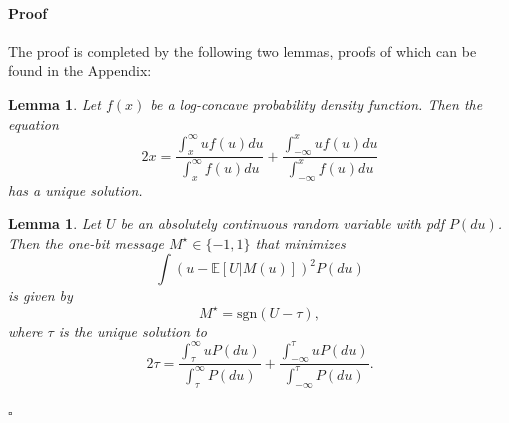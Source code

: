 \documentclass[letterpaper, conference,9pt]{IEEEtran}      %
\newtheorem{lem}[thm]{\bf {Lemma}}
\newenvironment{proof}{\paragraph*{Proof}}{\hfill$\square$ \newline}
\newcommand{\sgn}{\mathrm{sgn} }
\begin{document}
\begin{proof}
The proof is completed by the following two lemmas, proofs of which can be found in the Appendix:
\begin{lem} \label{lem:unique}
Let $f(x)$ be a log-concave probability density function. Then the equation 
\begin{equation}
\label{eq:lem_fixed_point}
2x = \frac{\int_x^\infty uf(u)du}{\int_x^\infty f(u)du} + \frac{\int_{-\infty}^x uf(u)du}{\int_{-\infty}^x f(u)du} 
\end{equation}
has a unique solution.
\end{lem}
\begin{lem} \label{lem:adaptive}
Let $U$ be an absolutely continuous random variable with
pdf $P(du)$. Then the one-bit message $M^\star\in \{-1,1\}$ that minimizes
\[
\int \left( u - \mathbb E[U|M(u)]  \right)^2 P(du)
\]
is given by
\[
M^\star  =  \sgn(U - \tau),
\]
where $\tau$ is the unique solution to
 \[
2 \tau = \frac{\int_{\tau}^\infty u P(du)} {\int_{\tau}^\infty P(du)} + \frac{\int_{-\infty}^{\tau} u P(du)}{\int_{-\infty}^{\tau} P(du)}.
\]
\end{lem}
\end{proof}
\end{document}
